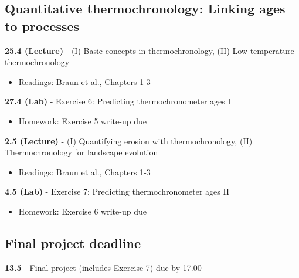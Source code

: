 \documentclass[11pt,a4paper]{article}
\begin{document}
\subsection*{Quantitative thermochronology: Linking ages to processes}
\textbf{25.4 (Lecture)} - (I) Basic concepts in thermochronology, (II) Low-temperature thermochronology
\begin{itemize}
  \item Readings: Braun et al., Chapters 1-3
\end{itemize}
\textbf{27.4 (Lab)} - Exercise 6: Predicting thermochronometer ages I
\begin{itemize}
  \item Homework: Exercise 5 write-up due
\end{itemize}

\noindent\textbf{2.5 (Lecture)} - (I) Quantifying erosion with thermochronology, (II) Thermochronology for landscape evolution
\begin{itemize}
  \item Readings: Braun et al., Chapters 1-3
\end{itemize}
\textbf{4.5 (Lab)} - Exercise 7: Predicting thermochronometer ages II
\begin{itemize}
  \item Homework: Exercise 6 write-up due
\end{itemize}

\subsection*{Final project deadline}
\textbf{13.5} - Final project (includes Exercise 7) due by 17.00
\end{document}
